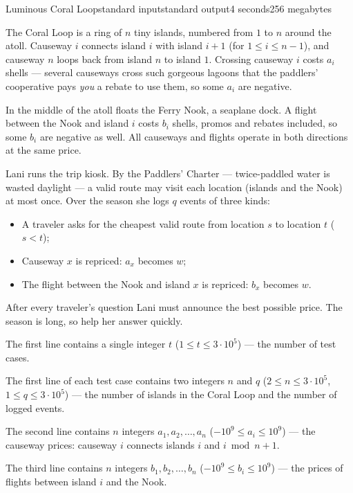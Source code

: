 \begin{problem}{Luminous Coral Loop}{standard input}{standard output}{4 seconds}{256 megabytes}

The Coral Loop is a ring of $n$ tiny islands, numbered from $1$ to $n$ around the atoll. Causeway $i$ connects island $i$ with island $i+1$ (for $1 \le i \le n-1$), and causeway $n$ loops back from island $n$ to island $1$. Crossing causeway $i$ costs $a_i$ shells --- several causeways cross such gorgeous lagoons that the paddlers' cooperative pays \emph{you} a rebate to use them, so some $a_i$ are negative.

In the middle of the atoll floats the Ferry Nook, a seaplane dock. A flight between the Nook and island $i$ costs $b_i$ shells, promos and rebates included, so some $b_i$ are negative as well. All causeways and flights operate in both directions at the same price.

Lani runs the trip kiosk. By the Paddlers' Charter --- twice-paddled water is wasted daylight --- a valid route may visit each location (islands and the Nook) at most once. Over the season she logs $q$ events of three kinds:

\begin{itemize}
\item A traveler asks for the cheapest valid route from location $s$ to location $t$ ($s < t$);
\item Causeway $x$ is repriced: $a_x$ becomes $w$;
\item The flight between the Nook and island $x$ is repriced: $b_x$ becomes $w$.
\end{itemize}

After every traveler's question Lani must announce the best possible price. The season is long, so help her answer quickly.


\InputFile
The first line contains a single integer $t$ ($1 \le t \le 3 \cdot 10^5$) --- the number of test cases.

The first line of each test case contains two integers $n$ and $q$ ($2 \le n \le 3 \cdot 10^5$, $1 \le q \le 3 \cdot 10^5$) --- the number of islands in the Coral Loop and the number of logged events.

The second line contains $n$ integers $a_1, a_2, \ldots, a_n$ ($-10^9 \le a_i \le 10^9$) --- the causeway prices: causeway $i$ connects islands $i$ and $i \bmod n + 1$.

The third line contains $n$ integers $b_1, b_2, \ldots, b_n$ ($-10^9 \le b_i \le 10^9$) --- the prices of flights between island $i$ and the Nook.


\end{problem}
